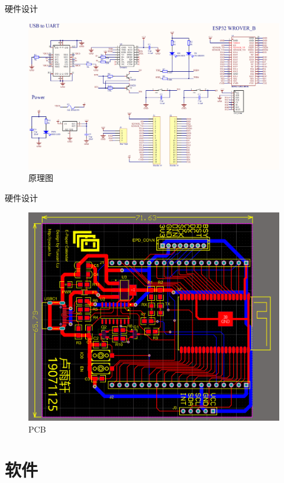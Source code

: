 \documentclass{ctexbeamer}
\begin{document}
\begin{frame}{硬件设计}
    \begin{figure}[htp]
      \centering
      \includegraphics[width=\linewidth]{image5.png}
      \caption{原理图}
    \end{figure}
\end{frame}

\begin{frame}{硬件设计}
    \begin{figure}[htp]
      \centering
      \includegraphics[width=.8\linewidth]{image6.png}
      \caption{PCB}
    \end{figure}
\end{frame}

\section{软件}
\end{document}
